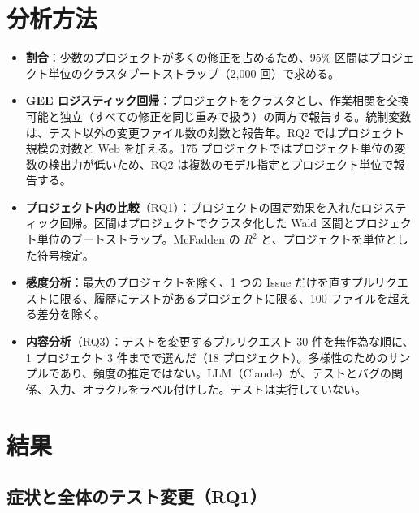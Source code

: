 \documentclass[a4paper,twocolumn,9pt]{ltjsarticle}
\begin{document}
\section{分析方法}\label{sec:methods}

\begin{itemize}
\item \textbf{割合}：少数のプロジェクトが多くの修正を占めるため、95\% 区間はプロジェクト単位のクラスタブートストラップ（2,000 回）で求める。
\item \textbf{GEE ロジスティック回帰}：プロジェクトをクラスタとし、作業相関を交換可能と独立（すべての修正を同じ重みで扱う）の両方で報告する。統制変数は、テスト以外の変更ファイル数の対数と報告年。RQ2 ではプロジェクト規模の対数と Web を加える。175 プロジェクトではプロジェクト単位の変数の検出力が低いため、RQ2 は複数のモデル指定とプロジェクト単位で報告する。
\item \textbf{プロジェクト内の比較}（RQ1）：プロジェクトの固定効果を入れたロジスティック回帰。区間はプロジェクトでクラスタ化した Wald 区間とプロジェクト単位のブートストラップ。McFadden の $R^2$ と、プロジェクトを単位とした符号検定。
\item \textbf{感度分析}：最大のプロジェクトを除く、1 つの Issue だけを直すプルリクエストに限る、履歴にテストがあるプロジェクトに限る、100 ファイルを超える差分を除く。
\item \textbf{内容分析}（RQ3）：テストを変更するプルリクエスト 30 件を無作為な順に、1 プロジェクト 3 件までで選んだ（18 プロジェクト）。多様性のためのサンプルであり、頻度の推定ではない。LLM（Claude）が、テストとバグの関係、入力、オラクルをラベル付けした。テストは実行していない。
\end{itemize}

\section{結果}\label{sec:results}

\subsection{症状と全体のテスト変更（RQ1）}
\end{document}
